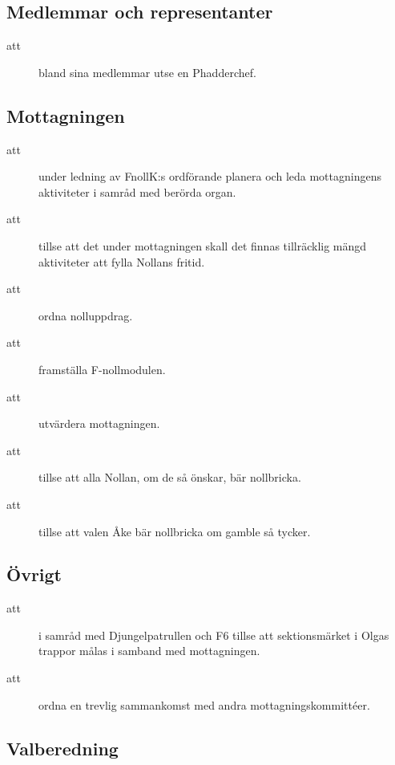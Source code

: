 \documentclass[a4paper]{article}
\begin{document}
\begin{foreningenv}{\forening{}}
    \subsection{Medlemmar och representanter}
    \begin{description}
        \item[att] bland sina medlemmar utse en Phadderchef.
    \end{description}
    
    \subsection{Mottagningen}
    \begin{description}
        \item[att] under ledning av FnollK:s ordförande planera och leda mottagningens aktiviteter i samråd med berörda organ.
        \item[att] tillse att det under mottagningen skall det finnas tillräcklig mängd aktiviteter att fylla Nollans fritid.
        \item[att] ordna nolluppdrag.
        \item[att] framställa F-nollmodulen.
        \item[att] utvärdera mottagningen.
        \item[att] tillse att alla Nollan, om de så önskar, bär nollbricka.
        \item[att] tillse att valen Åke bär nollbricka om gamble så tycker.
    \end{description}
    
    \subsection{Övrigt}
    \begin{description}
        \item[att] i samråd med Djungelpatrullen och F6 tillse att sektionsmärket i Olgas trappor målas i samband med mottagningen.
        \item[att] ordna en trevlig sammankomst med andra mottagningskommittéer.
    \end{description}
    
    \subsection{Valberedning}
    \aliggvalber{}
    

\end{foreningenv}
\end{document}
